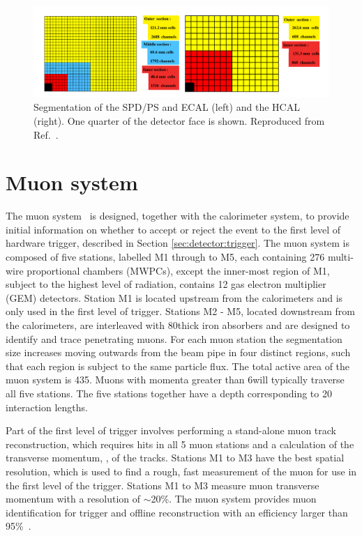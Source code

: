 \begin{figure}
\includegraphics[width=\linewidth]{figures/detector/calorimeters.pdf}
\caption{Segmentation of the SPD/PS and ECAL (left) and the HCAL (right). One quarter of the detector face is shown. Reproduced from Ref.~\cite{lhcbdetector2008}.}
\label{calorimeter}
\end{figure}

\section{Muon system}
\label{sec:detector:muon}

The muon system~\cite{LHCb-DP-2013-001,LHCb-DP-2012-002} is designed, together with the calorimeter system, to provide initial information on whether to accept or reject the event to the first level of hardware trigger, described in Section \ref{sec:detector:trigger}. The muon system is composed of five stations, labelled M1 through to M5, each containing 276 multi-wire proportional chambers (MWPCs), except the inner-most region of M1, subject to the highest level of radiation, contains 12 gas electron multiplier (GEM) detectors. Station M1 is located upstream from the calorimeters and is only used in the first level of trigger. Stations M2 - M5, located downstream from the calorimeters, are interleaved with 80\cm thick iron absorbers and are designed to identify and trace penetrating muons. For each muon station the segmentation size increases moving outwards from the beam pipe in four distinct regions, such that each region is subject to the same particle flux. The total active area of the muon system is 435\ma. Muons with momenta greater than 6\gevc will typically traverse all five stations. The five stations together have a depth corresponding to 20 interaction lengths. 

Part of the first level of trigger involves performing a stand-alone muon track reconstruction, which requires hits in all 5 muon stations and a calculation of the transverse momentum, \pt, of the tracks. Stations M1 to M3 have the best spatial resolution, which is used to find a rough, fast measurement of the muon \pt for use in the first level of the trigger. Stations M1 to M3 measure muon transverse momentum with a resolution of $\sim$20\%. The muon system provides muon identification for trigger and offline reconstruction with an efficiency larger than 95\%~\cite{LHCb-DP-2014-002}.

